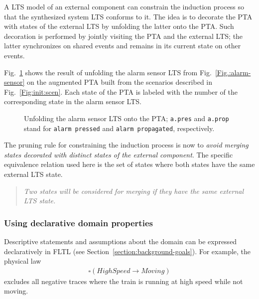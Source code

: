 A LTS model of an external component can constrain the induction process so that the synthesized system LTS conforms to it. The idea is to decorate the PTA with states of the external LTS by unfolding the latter onto the PTA. Such decoration is performed by jointly visiting the PTA and the external LTS; the latter synchronizes on shared events and remains in its current state on other events.

Fig.~\ref{Fig.:alarm-unfolded-pta} shows the result of unfolding the alarm sensor LTS from Fig.~\ref{Fig.:alarm-sensor} on the augmented PTA built from the scenarios described in Fig.~\ref{Fig:init:scen}. Each state of the PTA is labeled with the number of the corresponding state in the alarm sensor LTS. 

\begin{figure}
\centering
{}
\caption[Unfolding the alarm sensor LTS onto the PTA]{Unfolding the alarm sensor LTS onto the PTA; \texttt{a.pres} and \texttt{a.prop} stand for \texttt{alarm pressed} and \texttt{alarm propagated}, respectively\label{Fig.:alarm-unfolded-pta}.}
\end{figure}

The pruning rule for constraining the induction process is now to \emph{avoid merging states decorated with distinct states of the external component}. The specific equivalence relation used here is the set of states where both states have the same external LTS state. 

\begin{quote}
\emph{Two states will be considered for merging if they have the same external LTS state.}
\end{quote}


\subsubsection*{Using declarative domain properties}

Descriptive statements and assumptions about the domain can be expressed declaratively in FLTL (see Section~\ref{section:background-goals}). For example, the physical law
\begin{align*}
\square(HighSpeed \rightarrow Moving)
\end{align*}
\noindent excludes all negative traces where the train is running at high speed while not moving. 

